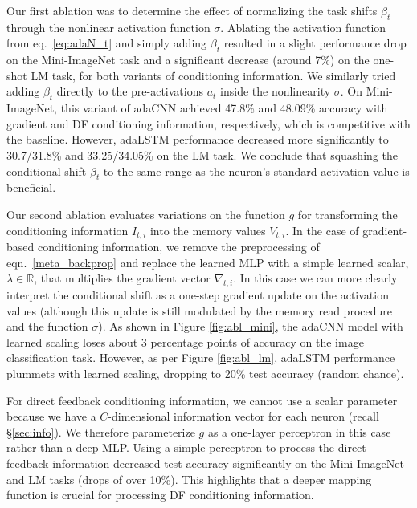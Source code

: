 \documentclass{article}
\begin{document}
Our first ablation was to determine the effect of normalizing the task shifts $\beta_t$ through the nonlinear activation function $\sigma$. Ablating the activation function from eq.~\ref{eq:adaN_t} and simply adding $\beta_t$ resulted in a slight performance drop on the Mini-ImageNet task and a significant decrease (around 7\%) on the one-shot LM task, for both variants of conditioning information.
We similarly tried adding $\beta_t$ directly to the pre-activations $a_t$ inside the nonlinearity $\sigma$. On Mini-ImageNet, this variant of adaCNN achieved 47.8\% and 48.09\% accuracy with gradient and DF conditioning information, respectively, which is competitive with the baseline.
However, adaLSTM performance decreased more significantly to 30.7/31.8\% and 33.25/34.05\% on the LM task.
We conclude that squashing the conditional shift $\beta_t$ to the same range as the neuron's standard activation value is beneficial.

Our second ablation evaluates variations on the function $g$ for transforming the conditioning information $I_{t,i}$ into the memory values $V_{t,i}$.
In the case of gradient-based conditioning information, we remove the preprocessing of eqn.~\ref{meta_backprop} and replace the learned MLP with a simple learned scalar, $\lambda \in \mathbb{R}$, that multiplies the gradient vector $\nabla_{t,i}$.
In this case we can more clearly interpret the conditional shift as a one-step gradient update on the activation values (although this update is still modulated by the memory read procedure and the function $\sigma$). As shown in Figure \ref{fig:abl_mini}, the adaCNN model with learned scaling loses about 3 percentage points of accuracy on the image classification task.
However, as per Figure \ref{fig:abl_lm}, adaLSTM performance plummets with learned scaling, dropping to 20\% test accuracy (random chance).

For direct feedback conditioning information, we cannot use a scalar parameter because we have a $C$-dimensional information vector for each neuron (recall \S\ref{sec:info}). We therefore parameterize $g$ as a one-layer perceptron in this case rather than a deep MLP.
Using a simple perceptron to process the direct feedback information decreased test accuracy significantly on the Mini-ImageNet and LM tasks (drops of over 10\%). This highlights that a deeper mapping function is crucial for processing DF conditioning information.
\end{document}
